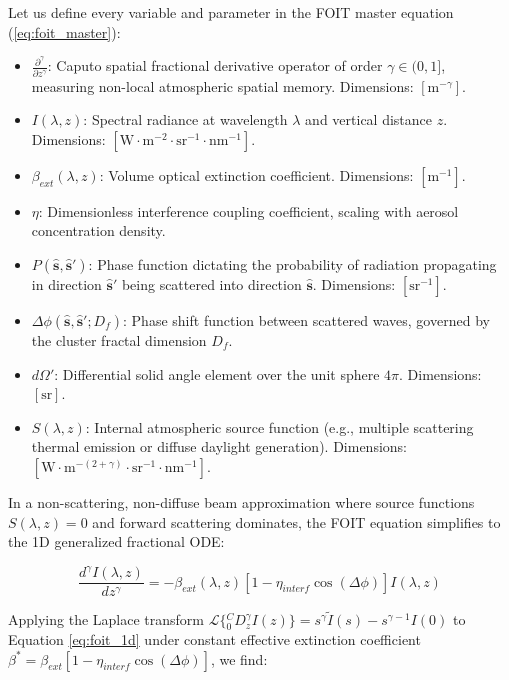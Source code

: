 \documentclass[12pt,a4paper]{article}
\begin{document}
Let us define every variable and parameter in the FOIT master equation (\ref{eq:foit_master}):
\begin{itemize}
    \item $\frac{\partial^\gamma}{\partial z^\gamma}$: Caputo spatial fractional derivative operator of order $\gamma \in (0, 1]$, measuring non-local atmospheric spatial memory. Dimensions: $[\text{m}^{-\gamma}]$.
    \item $I(\lambda, z)$: Spectral radiance at wavelength $\lambda$ and vertical distance $z$. Dimensions: $[\text{W} \cdot \text{m}^{-2} \cdot \text{sr}^{-1} \cdot \text{nm}^{-1}]$.
    \item $\beta_{ext}(\lambda, z)$: Volume optical extinction coefficient. Dimensions: $[\text{m}^{-1}]$.
    \item $\eta$: Dimensionless interference coupling coefficient, scaling with aerosol concentration density.
    \item $P(\mathbf{\hat{s}}, \mathbf{\hat{s}}')$: Phase function dictating the probability of radiation propagating in direction $\mathbf{\hat{s}}'$ being scattered into direction $\mathbf{\hat{s}}$. Dimensions: $[\text{sr}^{-1}]$.
    \item $\Delta \phi(\mathbf{\hat{s}}, \mathbf{\hat{s}}'; D_f)$: Phase shift function between scattered waves, governed by the cluster fractal dimension $D_f$.
    \item $d\Omega'$: Differential solid angle element over the unit sphere $4\pi$. Dimensions: $[\text{sr}]$.
    \item $S(\lambda, z)$: Internal atmospheric source function (e.g., multiple scattering thermal emission or diffuse daylight generation). Dimensions: $[\text{W} \cdot \text{m}^{-(2+\gamma)} \cdot \text{sr}^{-1} \cdot \text{nm}^{-1}]$.
\end{itemize}

In a non-scattering, non-diffuse beam approximation where source functions $S(\lambda, z) = 0$ and forward scattering dominates, the FOIT equation simplifies to the 1D generalized fractional ODE:

\begin{equation}
\frac{d^\gamma I(\lambda, z)}{dz^\gamma} = -\beta_{ext}(\lambda, z) \left[ 1 - \eta_{interf} \cos(\Delta \phi) \right] I(\lambda, z)
\label{eq:foit_1d}
\end{equation}

Applying the Laplace transform $\mathcal{L}\{{}^C_0 D^\gamma_z I(z)\} = s^\gamma \tilde{I}(s) - s^{\gamma-1} I(0)$ to Equation \ref{eq:foit_1d} under constant effective extinction coefficient $\beta^* = \beta_{ext} [1 - \eta_{interf} \cos(\Delta \phi)]$, we find:
\end{document}
